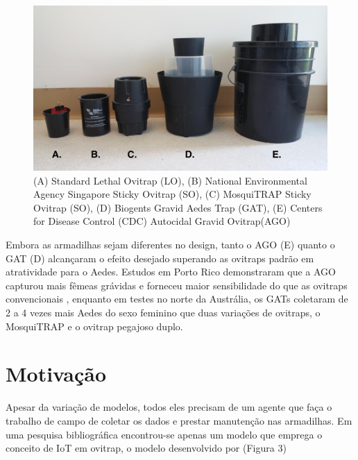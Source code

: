 \documentclass[
	12pt,				%
	openright,			%
	oneside,			%
	a4paper,			%
	chapter=TITLE,		%
	english,			%
	brazil				%
	]{abntex2}
\begin{document}
\begin{figure}[h!]
\centering
\includegraphics[scale=0.3]{imagens/exemplosovitraps.png}
 \caption{(A) Standard Lethal Ovitrap (LO), (B) National Environmental Agency Singapore Sticky Ovitrap (SO), (C) MosquiTRAP 
 Sticky Ovitrap (SO), (D) Biogents Gravid Aedes Trap (GAT), (E) Centers for Disease Control (CDC) Autocidal Gravid Ovitrap(AGO)}
    \label{fig:evolucaoOvitraps}
\end{figure}

Embora as armadilhas sejam diferentes no design, tanto o AGO (E) quanto o GAT (D)
alcançaram o efeito desejado superando as ovitraps padrão em atratividade para o Aedes.
Estudos em Porto Rico demonstraram que a AGO capturou mais fêmeas grávidas e
forneceu maior sensibilidade do que as ovitraps convencionais \cite{BRIANJJOHNSON2017}, enquanto em testes no norte da 
Austrália, os GATs coletaram de 2 a 4 vezes mais Aedes do sexo feminino que
duas variações de ovitraps, o MosquiTRAP e o ovitrap pegajoso duplo. 

\section{Motivação}
Apesar da variação de modelos, todos eles precisam de um agente que faça o trabalho de
campo de coletar os dados e prestar manutenção nas armadilhas. Em uma pesquisa
bibliográfica encontrou-se apenas um modelo que emprega o conceito de IoT em ovitrap, o modelo desenvolvido por \cite{ISMALIZA2019} (Figura 3)
\end{document}
